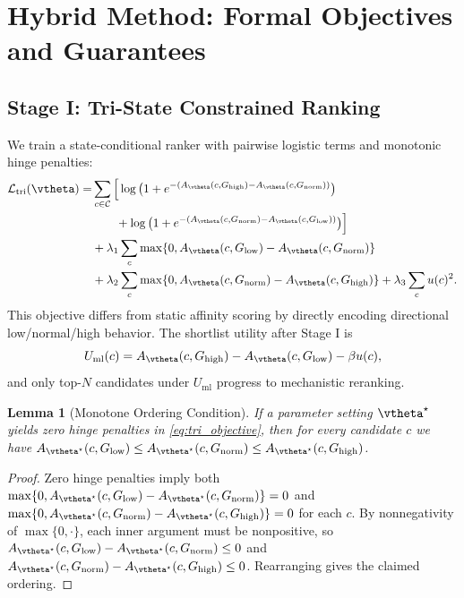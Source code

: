 \documentclass{article} %
\newtheorem{lemma}[theorem]{Lemma}
\begin{document}
\section{Hybrid Method: Formal Objectives and Guarantees}
\label{sec:method}
\subsection{Stage I: Tri-State Constrained Ranking}
We train a state-conditional ranker with pairwise logistic terms and monotonic hinge penalties:
\begin{equation}
\begin{aligned}
\mathcal{L}_{\mathrm{tri}}(\vtheta)=&\sum_{c\in\mathcal{C}}\Big[\log\big(1+e^{-(A_{\vtheta}(c,G_{\mathrm{high}})-A_{\vtheta}(c,G_{\mathrm{norm}}))}\big) \\
&\qquad +\log\big(1+e^{-(A_{\vtheta}(c,G_{\mathrm{norm}})-A_{\vtheta}(c,G_{\mathrm{low}}))}\big)\Big] \\
&+\lambda_1\sum_{c}\max\{0, A_{\vtheta}(c,G_{\mathrm{low}})-A_{\vtheta}(c,G_{\mathrm{norm}})\} \\
&+\lambda_2\sum_{c}\max\{0, A_{\vtheta}(c,G_{\mathrm{norm}})-A_{\vtheta}(c,G_{\mathrm{high}})\} + \lambda_3\sum_c u(c)^2.
\end{aligned}
\label{eq:tri_objective}
\end{equation}
This objective differs from static affinity scoring by directly encoding directional low/normal/high behavior. The shortlist utility after Stage I is
\begin{equation}
U_{\mathrm{ml}}(c)=A_{\vtheta}(c,G_{\mathrm{high}})-A_{\vtheta}(c,G_{\mathrm{low}})-\beta u(c),
\label{eq:stage1_utility}
\end{equation}
and only top-$N$ candidates under $U_{\mathrm{ml}}$ progress to mechanistic reranking.

\begin{lemma}[Monotone Ordering Condition]
\label{lem:monotone}
If a parameter setting $\vtheta^{\star}$ yields zero hinge penalties in \eqref{eq:tri_objective}, then for every candidate $c$ we have
$A_{\vtheta^{\star}}(c,G_{\mathrm{low}})\le A_{\vtheta^{\star}}(c,G_{\mathrm{norm}})\le A_{\vtheta^{\star}}(c,G_{\mathrm{high}})$.
\end{lemma}
\begin{proof}
Zero hinge penalties imply both
$\max\{0, A_{\vtheta^{\star}}(c,G_{\mathrm{low}})-A_{\vtheta^{\star}}(c,G_{\mathrm{norm}})\}=0$ and
$\max\{0, A_{\vtheta^{\star}}(c,G_{\mathrm{norm}})-A_{\vtheta^{\star}}(c,G_{\mathrm{high}})\}=0$ for each $c$.
By nonnegativity of $\max\{0,\cdot\}$, each inner argument must be nonpositive, so
$A_{\vtheta^{\star}}(c,G_{\mathrm{low}})-A_{\vtheta^{\star}}(c,G_{\mathrm{norm}})\le 0$ and
$A_{\vtheta^{\star}}(c,G_{\mathrm{norm}})-A_{\vtheta^{\star}}(c,G_{\mathrm{high}})\le 0$.
Rearranging gives the claimed ordering.\qedhere
\end{proof}
\end{document}
